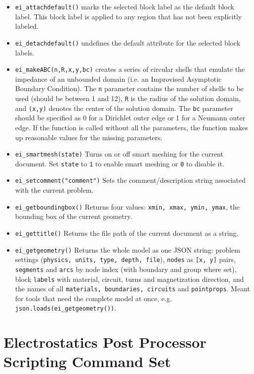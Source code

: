 \begin{itemize}
\item{\tt ei\_attachdefault()} marks the
selected block label as the default block label.  This block label
is applied to any region that has not been explicitly labeled.

\item{\tt ei\_detachdefault()} undefines the default
attribute for the selected block labels.

\item{\tt ei\_makeABC(n,R,x,y,bc)} creates a series of circular shells that emulate the
impedance of an unbounded domain (i.e. an Improvised Asymptotic Boundary
Condition).  The {\tt n} parameter contains the number of shells to be used
(should be between 1 and 12), {\tt R} is the radius of the solution domain, and
{\tt (x,y)} denotes the center of the solution domain.  The {\tt bc} parameter should
be specified as 0 for a Dirichlet outer edge or 1 for a Neumann outer edge.
If the function is called without all the parameters, the function makes up
reasonable values for the missing parameters.

\item{\tt ei\_smartmesh(state)} Turns on or off smart meshing for the current document.  Set {\tt state} to {\tt 1} to enable smart meshing or {\tt 0} to disable it.

\item{\tt ei\_setcomment("comment")} Sets the comment/description string associated with the current problem.

\item{\tt ei\_getboundingbox()} Returns four values: {\tt xmin, xmax, ymin, ymax}, the bounding box of the current geometry.

\item{\tt ei\_gettitle()} Returns the file path of the current document as a string.

\item{\tt ei\_getgeometry()} Returns the whole model as one JSON string: problem settings ({\tt physics, units, type, depth, file}), {\tt nodes} as {\tt [x, y]} pairs, {\tt segments} and {\tt arcs} by node index (with boundary and group where set), block {\tt labels} with material, circuit, turns and magnetization direction, and the names of all {\tt materials, boundaries, circuits} and {\tt pointprops}. Meant for tools that need the complete model at once, e.g. {\tt json.loads(ei\_getgeometry())}.

\end{itemize}

\section{Electrostatics Post Processor Scripting Command Set}

